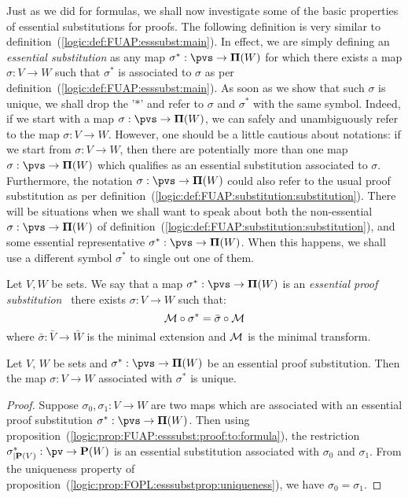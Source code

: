 Just as we did for formulas, we shall now investigate some of the
basic properties of essential substitutions for proofs. The
following definition is very similar to
definition~(\ref{logic:def:FUAP:esssubst:main}). In effect, we are
simply defining an {\em essential substitution} as any map
$\sigma^{*}:\pvs\to{\bf\Pi}(W)$ for which there exists a map
$\sigma:V\to W$ such that $\sigma^{*}$ is associated to $\sigma$ as
per definition~(\ref{logic:def:FUAP:esssubst:main}). As soon as we
show that such $\sigma$ is unique, we shall drop the '$*$' and refer
to $\sigma$ and $\sigma^{*}$ with the same symbol. Indeed, if we
start with a map $\sigma:\pvs\to{\bf\Pi}(W)$, we can safely and
unambiguously refer to the map $\sigma:V\to W$. However, one should
be a little cautious about notations: if we start from $\sigma:V\to
W$, then there are potentially more than one map
$\sigma:\pvs\to{\bf\Pi}(W)$ which qualifies as an essential
substitution associated to $\sigma$. Furthermore, the notation
$\sigma:\pvs\to{\bf\Pi}(W)$ could also refer to the usual proof
substitution as per
definition~(\ref{logic:def:FUAP:substitution:substitution}). There
will be situations when we shall want to speak about both the
non-essential $\sigma:\pvs\to{\bf\Pi}(W)$ of
definition~(\ref{logic:def:FUAP:substitution:substitution}), and
some essential representative $\sigma^{*}:\pvs\to{\bf\Pi}(W)$. When
this happens, we shall use a different symbol $\sigma^{*}$ to single
out one of them.

\begin{defin}\label{logic:def:FUAP:esssubstprop:essential}
Let $V,W$ be sets. We say that a map $\sigma^{*}:\pvs\to{\bf\Pi}(W)$
is an {\em essential proof substitution} \ifand\ there exists
$\sigma:V\to W$ such that:
    \[
    {\cal M}\circ\sigma^{*}=\bar{\sigma}\circ{\cal M}
    \]
where $\bar{\sigma}:\bar{V}\to\bar{W}$ is the minimal extension and
${\cal M}$ is the minimal transform.
\end{defin}

\begin{prop}\label{logic:prop:FUAP:esssubstprop:uniqueness}
Let $V$, $W$ be sets and $\sigma^{*}:\pvs\to{\bf\Pi}(W)$ be an
essential proof substitution. Then the map $\sigma:V\to W$
associated with $\sigma^{*}$ is unique.
\end{prop}
\begin{proof}
Suppose $\sigma_{0},\sigma_{1}:V\to W$ are two maps which are
associated with an essential proof substitution
$\sigma^{*}:\pvs\to{\bf\Pi}(W)$. Then using
proposition~(\ref{logic:prop:FUAP:esssubst:proof:to:formula}), the
restriction $\sigma^{*}_{|{\bf P}(V)}:\pv\to{\bf P}(W)$ is an
essential substitution associated with $\sigma_{0}$ and
$\sigma_{1}$. From the uniqueness property of
proposition~(\ref{logic:prop:FOPL:esssubstprop:uniqueness}), we have
$\sigma_{0}=\sigma_{1}$.
\end{proof}

